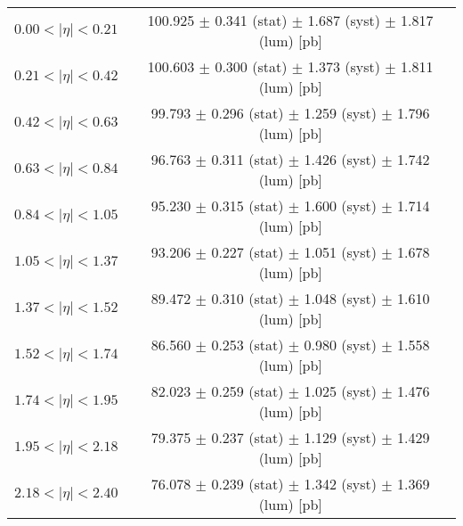\begin{tabular}{lc}
\hline
$0.00 < |\eta| <0.21$          & 100.925 $\pm$ 0.341 (stat) $\pm$ 1.687 (syst) $\pm$ 1.817 (lum) [pb]  \\
$0.21 < |\eta| <0.42$          & 100.603 $\pm$ 0.300 (stat) $\pm$ 1.373 (syst) $\pm$ 1.811 (lum) [pb]  \\
$0.42 < |\eta| <0.63$          & 99.793 $\pm$ 0.296 (stat) $\pm$ 1.259 (syst) $\pm$ 1.796 (lum) [pb]  \\
$0.63 < |\eta| <0.84$          & 96.763 $\pm$ 0.311 (stat) $\pm$ 1.426 (syst) $\pm$ 1.742 (lum) [pb]  \\
$0.84 < |\eta| <1.05$          & 95.230 $\pm$ 0.315 (stat) $\pm$ 1.600 (syst) $\pm$ 1.714 (lum) [pb]  \\
$1.05 < |\eta| <1.37$          & 93.206 $\pm$ 0.227 (stat) $\pm$ 1.051 (syst) $\pm$ 1.678 (lum) [pb]  \\
$1.37 < |\eta| <1.52$          & 89.472 $\pm$ 0.310 (stat) $\pm$ 1.048 (syst) $\pm$ 1.610 (lum) [pb]  \\
$1.52 < |\eta| <1.74$          & 86.560 $\pm$ 0.253 (stat) $\pm$ 0.980 (syst) $\pm$ 1.558 (lum) [pb]  \\
$1.74 < |\eta| <1.95$          & 82.023 $\pm$ 0.259 (stat) $\pm$ 1.025 (syst) $\pm$ 1.476 (lum) [pb]  \\
$1.95 < |\eta| <2.18$          & 79.375 $\pm$ 0.237 (stat) $\pm$ 1.129 (syst) $\pm$ 1.429 (lum) [pb]  \\
$2.18 < |\eta| <2.40$          & 76.078 $\pm$ 0.239 (stat) $\pm$ 1.342 (syst) $\pm$ 1.369 (lum) [pb]  \\
\hline
\end{tabular}
